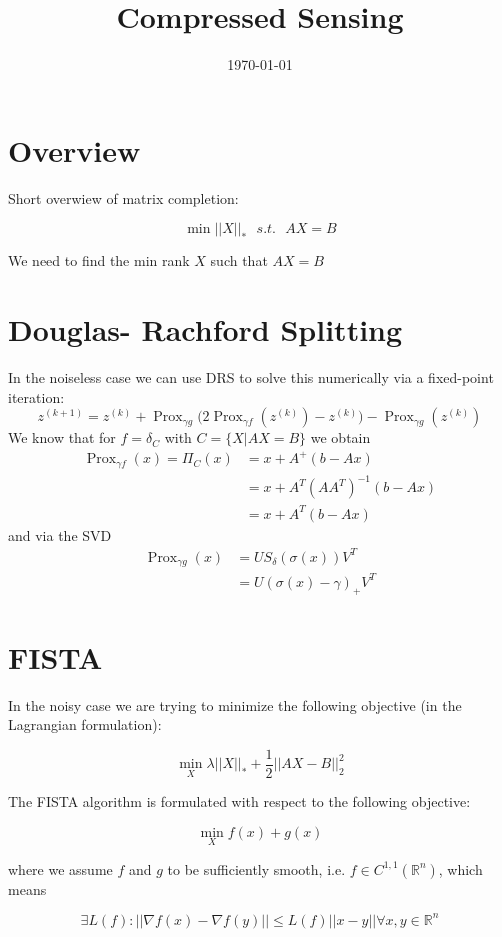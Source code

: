 \documentclass{article}
\title{Compressed Sensing}
\date{\today}
\DeclareMathOperator{\Prox}{Prox}
\begin{document}
\maketitle

\section{Overview}

Short overwiew of matrix completion:

$$\min ||X||_* \ \ \ s. t. \ \ \ AX = B$$

We need to find the min rank $X$ such that $AX = B$

\section{Douglas- Rachford Splitting}

In the noiseless case we can use DRS to solve this numerically via a fixed-point iteration: 
$$z^{(k+1)} = z^{(k)} + \Prox_{\gamma g}\Big(2 \Prox_{\gamma f}(z^{(k)}) - z^{(k)}\Big) - \Prox_{\gamma g}(z^{(k)})$$
We know that for $f = \delta_C$ with $C = \lbrace X | AX = B \rbrace$ we obtain
\begin{align*}
\Prox_{\gamma f}(x) = \Pi_C(x) &= x + A^+(b-Ax)
\\ &= x + A^T(A A^T)^{-1}(b - Ax)
\\ &= x + A^T(b-Ax)
\end{align*}
and via the SVD
\begin{align*}
\Prox_{\gamma g}(x) &= U S_\delta(\sigma(x))V^T
\\ &= U (\sigma(x) - \gamma)_{+} V^T
\end{align*}


\section{FISTA}

In the noisy case we are trying to minimize the following objective (in the Lagrangian formulation):

$$\min_X \lambda||X||_*  + \frac{1}{2} ||AX - B||_2^2$$

The FISTA algorithm is formulated with respect to the following objective:

$$\min_X f(x) + g(x)$$

where we assume $f$ and $g$ to be sufficiently smooth, i.e. $f \in C^{1,1}(\mathbb{R}^n)$, which means

$$\exists L(f) : ||\nabla f(x) - \nabla f(y)|| \leq L(f)||x - y|| \forall x,y \in \mathbb{R}^n$$
\end{document}
